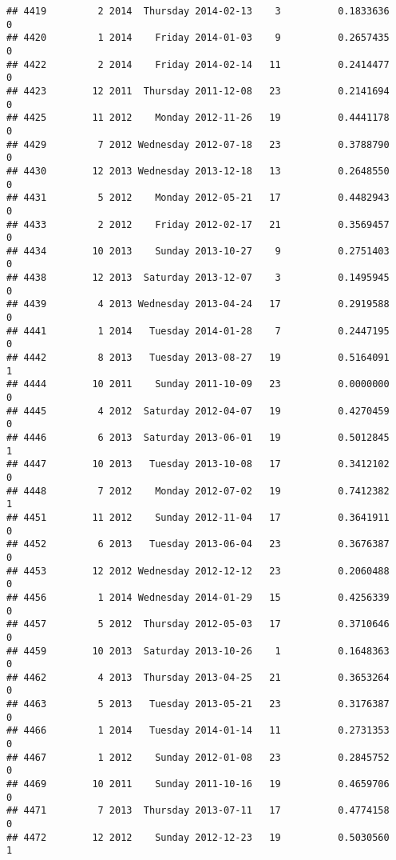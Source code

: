\documentclass[
]{article}
\begin{document}
\begin{verbatim}
## 4419         2 2014  Thursday 2014-02-13    3          0.1833636             0
## 4420         1 2014    Friday 2014-01-03    9          0.2657435             0
## 4422         2 2014    Friday 2014-02-14   11          0.2414477             0
## 4423        12 2011  Thursday 2011-12-08   23          0.2141694             0
## 4425        11 2012    Monday 2012-11-26   19          0.4441178             0
## 4429         7 2012 Wednesday 2012-07-18   23          0.3788790             0
## 4430        12 2013 Wednesday 2013-12-18   13          0.2648550             0
## 4431         5 2012    Monday 2012-05-21   17          0.4482943             0
## 4433         2 2012    Friday 2012-02-17   21          0.3569457             0
## 4434        10 2013    Sunday 2013-10-27    9          0.2751403             0
## 4438        12 2013  Saturday 2013-12-07    3          0.1495945             0
## 4439         4 2013 Wednesday 2013-04-24   17          0.2919588             0
## 4441         1 2014   Tuesday 2014-01-28    7          0.2447195             0
## 4442         8 2013   Tuesday 2013-08-27   19          0.5164091             1
## 4444        10 2011    Sunday 2011-10-09   23          0.0000000             0
## 4445         4 2012  Saturday 2012-04-07   19          0.4270459             0
## 4446         6 2013  Saturday 2013-06-01   19          0.5012845             1
## 4447        10 2013   Tuesday 2013-10-08   17          0.3412102             0
## 4448         7 2012    Monday 2012-07-02   19          0.7412382             1
## 4451        11 2012    Sunday 2012-11-04   17          0.3641911             0
## 4452         6 2013   Tuesday 2013-06-04   23          0.3676387             0
## 4453        12 2012 Wednesday 2012-12-12   23          0.2060488             0
## 4456         1 2014 Wednesday 2014-01-29   15          0.4256339             0
## 4457         5 2012  Thursday 2012-05-03   17          0.3710646             0
## 4459        10 2013  Saturday 2013-10-26    1          0.1648363             0
## 4462         4 2013  Thursday 2013-04-25   21          0.3653264             0
## 4463         5 2013   Tuesday 2013-05-21   23          0.3176387             0
## 4466         1 2014   Tuesday 2014-01-14   11          0.2731353             0
## 4467         1 2012    Sunday 2012-01-08   23          0.2845752             0
## 4469        10 2011    Sunday 2011-10-16   19          0.4659706             0
## 4471         7 2013  Thursday 2013-07-11   17          0.4774158             0
## 4472        12 2012    Sunday 2012-12-23   19          0.5030560             1

\end{verbatim}
\end{document}
